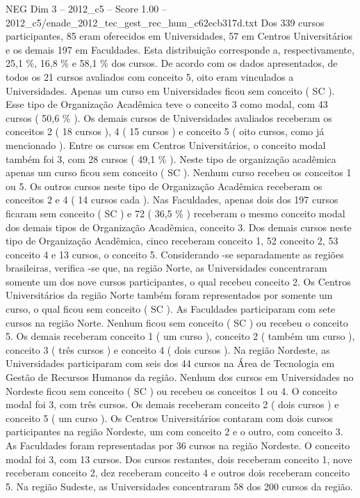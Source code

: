 \begin{textsample}{NEG Dim 3 – 2012\_c5 – Score 1.00 – 2012\_c5/enade\_2012\_tec\_gest\_rec\_hum\_c62ecb317d.txt}
Dos 339 cursos participantes, 85 eram oferecidos em Universidades, 57 em Centros Universitários e os demais 197 em Faculdades.
Esta distribuição corresponde a, respectivamente, 25,1 \%, 16,8 \% e 58,1 \% dos cursos.
De acordo com os dados apresentados, de todos os 21 cursos avaliados com conceito 5, oito eram vinculados a Universidades.
Apenas um curso em Universidades ficou sem conceito ( SC ).
Esse tipo de Organização Acadêmica teve o conceito 3 como modal, com 43 cursos ( 50,6 \% ).
Os demais cursos de Universidades avaliados receberam os conceitos 2 ( 18 cursos ), 4 ( 15 cursos ) e conceito 5 ( oito cursos, como já mencionado ).
Entre os cursos em Centros Universitários, o conceito modal também foi 3, com 28 cursos ( 49,1 \% ).
Neste tipo de organização acadêmica apenas um curso ficou sem conceito ( SC ).
Nenhum curso recebeu os conceitos 1 ou 5.
Os outros cursos neste tipo de Organização Acadêmica receberam os conceitos 2 e 4 ( 14 cursos cada ).
Nas Faculdades, apenas dois dos 197 cursos ficaram sem conceito ( SC ) e 72 ( 36,5 \% ) receberam o mesmo conceito modal dos demais tipos de Organização Acadêmica, conceito 3.
Dos demais cursos neste tipo de Organização Acadêmica, cinco receberam conceito 1, 52 conceito 2, 53 conceito 4 e 13 cursos, o conceito 5.
Considerando -se separadamente as regiões brasileiras, verifica -se que, na região Norte, as Universidades concentraram somente um dos nove cursos participantes, o qual recebeu conceito 2.
Os Centros Universitários da região Norte também foram representados por somente um curso, o qual ficou sem conceito ( SC ).
As Faculdades participaram com sete cursos na região Norte.
Nenhum ficou sem conceito ( SC ) ou recebeu o conceito 5.
Os demais receberam conceito 1 ( um curso ), conceito 2 ( também um curso ), conceito 3 ( três cursos ) e conceito 4 ( dois cursos ).
Na região Nordeste, as Universidades participaram com seis dos 44 cursos na Área de Tecnologia em Gestão de Recursos Humanos da região.
Nenhum dos cursos em Universidades no Nordeste ficou sem conceito ( SC ) ou recebeu os conceitos 1 ou 4.
O conceito modal foi 3, com três cursos.
Os demais receberam conceito 2 ( dois cursos ) e conceito 5 ( um curso ).
Os Centros Universitários contaram com dois cursos participantes na região Nordeste, um com conceito 2 e o outro, com conceito 3.
As Faculdades foram representadas por 36 cursos na região Nordeste.
O conceito modal foi 3, com 13 cursos.
Dos cursos restantes, dois receberam conceito 1, nove receberam conceito 2, dez receberam conceito 4 e outros dois receberam conceito 5.
Na região Sudeste, as Universidades concentraram 58 dos 200 cursos da região.

\end{textsample}
